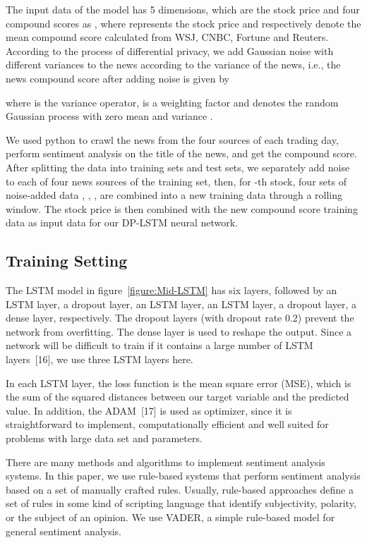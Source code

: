 \documentclass{article}
\begin{document}
The input data of the model has 5 dimensions, which are the stock price and four compound scores as , where  represents the stock price and  respectively denote the mean compound score calculated from WSJ, CNBC, Fortune and Reuters. According to the process of differential privacy, we add Gaussian noise with different variances to the news according to the variance of the news, i.e., the news compound score after adding noise is given by

where  is the variance operator,  is a weighting factor and  denotes the random Gaussian process with zero mean and variance .



We used python to crawl the news from the four sources of each trading day, perform sentiment analysis on the title of the news, and get the compound score. After splitting the data into training sets and test sets, we separately add noise to each of four news sources of the training set, then, for -th stock, four sets of noise-added data , , ,  are combined into a new training data through a rolling window. The stock price is then combined with the new compound score training data as input data for our DP-LSTM neural network.




\subsection{Training Setting}
The LSTM model in figure~\ref{figure:Mid-LSTM} has six layers, followed by an LSTM layer, a dropout layer, an LSTM layer, an LSTM layer, a dropout layer, a dense layer, respectively. The dropout layers (with dropout rate 0.2) prevent the network from overfitting. The dense layer is used to reshape the output. Since a network will be difficult to train if it contains a large number of LSTM layers~[16], we use three LSTM layers here.

In each LSTM layer, the loss function is the mean square error (MSE), which is the sum of the squared distances between our target variable and the predicted value. In addition, the ADAM~[17] is used as optimizer, since it is straightforward to implement, computationally efficient and well suited for problems with large data set and parameters.

There are many methods and algorithms to implement sentiment analysis systems. In this paper, we use rule-based systems that perform sentiment analysis based on a set of manually crafted rules. Usually, rule-based approaches define a set of rules in some kind of scripting language that identify subjectivity, polarity, or the subject of an opinion. We use VADER, a simple rule-based model for general
sentiment analysis.
\end{document}
